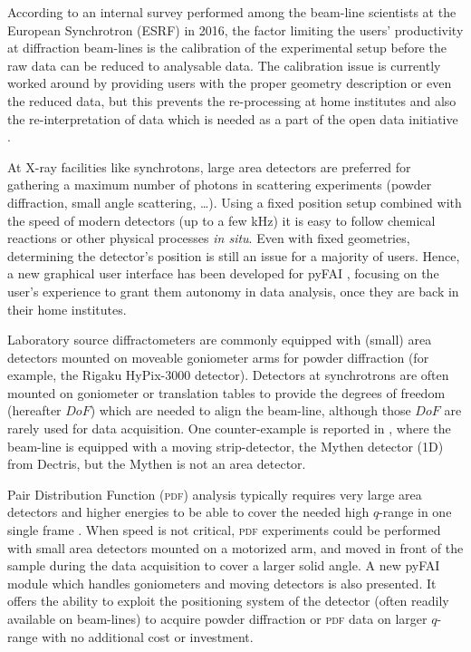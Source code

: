 \documentclass[preprint]{iucr}              %
\begin{document}
According to an internal survey performed among the beam-line scientists at
the European Synchrotron (ESRF) in 2016, the factor limiting the users'
productivity at diffraction beam-lines is the calibration of the experimental
setup before the raw data can be reduced to analysable data.
The calibration issue is currently worked around by providing users with the
proper geometry description or even the reduced data, but this prevents the
re-processing at home institutes and also the re-interpretation of data which
is needed as a part of the open data initiative \cite{Wilkinson2016}.

At X-ray facilities like synchrotons, large area detectors are 
preferred for gathering a maximum number of photons in
scattering experiments (powder diffraction, small angle
scattering, \ldots).
Using a fixed position setup combined with the speed of modern detectors (up
to a few kHz) it is easy to follow chemical reactions or other physical processes \textit{in situ}.
Even with fixed geometries, determining the detector's position is
still an issue for a majority of users. 
Hence, a new graphical user interface has been developed for pyFAI
\cite{pyFAI_0.18}, focusing on the user's experience to grant them autonomy in
data analysis, once they are back in their home institutes.

Laboratory source diffractometers
are commonly equipped with (small) area detectors mounted on moveable goniometer
arms for powder diffraction (for example, the Rigaku HyPix-3000 detector).
Detectors at synchrotrons are often mounted on goniometer or
translation tables to provide the degrees of freedom (hereafter $DoF$) which are 
needed to align the beam-line, although those $DoF$ are rarely used for data acquisition.
One counter-example is reported in \cite{Gao:kc5032}, where the beam-line
is equipped with a moving strip-detector, the Mythen detector (1D) from Dectris,
but the Mythen is not an area detector.




Pair Distribution Function (\textsc{pdf}) analysis typically requires very large area
detectors and higher energies to be able to cover the needed high $q$-range in
one single frame \cite{Chupas:wf5000}.
When speed is not critical, \textsc{pdf} experiments could be performed
with small area detectors mounted on a motorized arm, and moved in front of
the sample during the data acquisition to cover a larger solid angle. 
A new pyFAI module which handles goniometers and moving detectors is also presented.
It offers the ability to exploit the positioning system of the detector 
(often readily available on beam-lines) to acquire powder diffraction or \textsc{pdf} data 
on larger $q$-range with no additional cost or investment.
\end{document}
